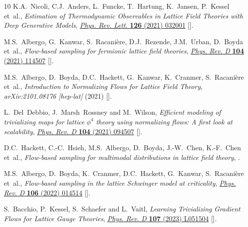 \begin{thebibliography}{10}
K.A.~Nicoli, C.J.~Anders, L.~Funcke, T.~Hartung, K.~Jansen, P.~Kessel et~al.,
  \emph{Estimation of {{Thermodynamic Observables}} in {{Lattice Field
  Theories}} with {{Deep Generative Models}}},
  \href{https://doi.org/10.1103/PhysRevLett.126.032001}{\emph{Phys. Rev. Lett.}
  {\bfseries 126} (2021) 032001}
  [\href{https://arxiv.org/abs/2007.07115}{{}}].

M.S.~Albergo, G.~Kanwar, S.~Racani{\`e}re, D.J.~Rezende, J.M.~Urban, D.~Boyda
  et~al., \emph{Flow-based sampling for fermionic lattice field theories},
  \href{https://doi.org/10.1103/PhysRevD.104.114507}{\emph{Phys. Rev. D}
  {\bfseries 104} (2021) 114507}
  [\href{https://arxiv.org/abs/2106.05934}{{}}].

M.S.~Albergo, D.~Boyda, D.C.~Hackett, G.~Kanwar, K.~Cranmer, S.~Racani{\`e}re
  et~al., \emph{Introduction to {{Normalizing Flows}} for {{Lattice Field
  Theory}}}, {\emph{arXiv:2101.08176 [hep-lat]} (2021) }
  [\href{https://arxiv.org/abs/2101.08176}{{}}].

L.~Del~Debbio, J.~Marsh~Rossney and M.~Wilson, \emph{Efficient modeling of
  trivializing maps for lattice $\phi^4$ theory using normalizing flows: {{A}}
  first look at scalability},
  \href{https://doi.org/10.1103/PhysRevD.104.094507}{\emph{Phys. Rev. D}
  {\bfseries 104} (2021) 094507}
  [\href{https://arxiv.org/abs/2105.12481}{{}}].

D.C.~Hackett, C.-C.~Hsieh, M.S.~Albergo, D.~Boyda, J.-W.~Chen, K.-F.~Chen
  et~al., \emph{{Flow-based sampling for multimodal distributions in lattice
  field theory}},  \href{https://arxiv.org/abs/2107.00734}{{}}.

M.S.~Albergo, D.~Boyda, K.~Cranmer, D.C.~Hackett, G.~Kanwar, S.~Racani{\`e}re
  et~al., \emph{Flow-based sampling in the lattice {{Schwinger}} model at
  criticality}, \href{https://doi.org/10.1103/PhysRevD.106.014514}{\emph{Phys.
  Rev. D} {\bfseries 106} (2022) 014514}
  [\href{https://arxiv.org/abs/2202.11712}{{}}].

S.~Bacchio, P.~Kessel, S.~Schaefer and L.~Vaitl, \emph{Learning {{Trivializing
  Gradient Flows}} for {{Lattice Gauge Theories}}},
  \href{https://doi.org/10.1103/PhysRevD.107.L051504}{\emph{Phys. Rev. D}
  {\bfseries 107} (2023) L051504}
  [\href{https://arxiv.org/abs/2212.08469}{{}}].


\end{thebibliography}
